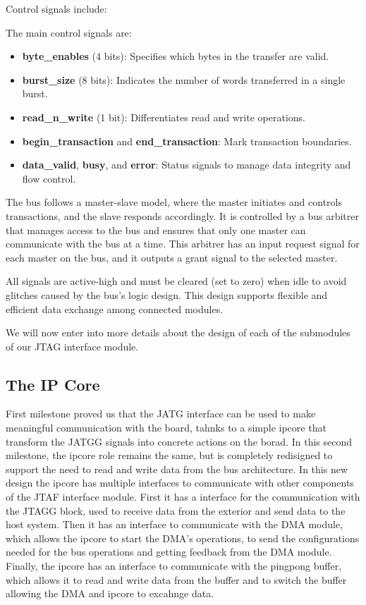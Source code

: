 \documentclass[a4paper,11pt,oneside]{report}
\begin{document}
Control signals include:

The main control signals are:

\begin{itemize}
    \item \textbf{byte\_enables} (4 bits): Specifies which bytes in the transfer are valid.
    \item \textbf{burst\_size} (8 bits): Indicates the number of words transferred in a single burst.
    \item \textbf{read\_n\_write} (1 bit): Differentiates read and write operations.
    \item \textbf{begin\_transaction} and \textbf{end\_transaction}: Mark transaction boundaries.
    \item \textbf{data\_valid}, \textbf{busy}, and \textbf{error}: Status signals to manage data integrity and flow control.
\end{itemize}

The bus follows a master-slave model, where the master initiates and controls transactions, and the slave responds accordingly. It is
controlled by a bus arbitrer that manages access to the bus and ensures that only one master can communicate with the bus at a time.
This arbitrer has an input request signal for each master on the bus, and it outputs a grant signal to the selected master.

All signals are active-high and must be cleared (set to zero) when idle to avoid glitches caused by the bus’s logic design. 
This design supports flexible and efficient data exchange among connected modules.

We will now enter into more details about the design of each of the submodules of our JTAG interface module.

\subsection{The IP Core}

First milestone proved us that the JATG interface can be used to make meaningful communication with the board, tahnks to a simple ipcore that
transform the JATGG signals into concrete actions on the borad. In this second milestone, the ipcore role remains the same, 
but is completely redisigned to support the need to read and write data from the bus architecture. In this new design the ipcore has multiple interfaces to 
communicate with other components of the JTAF interface module.
First it has a interface for the communication with the JTAGG block, used to receive data from the exterior and send data to the host system.
Then it has an interface to communicate with the DMA module, which allows the ipcore to start the DMA's operations, to send the configurations needed for the bus operations and 
getting feedback from the DMA module.
Finally, the ipcore has an interface to communicate with the pingpong buffer, which allows it to read and write data from the buffer and to switch the buffer allowing the DMA and ipcore to 
excahnge data.
\end{document}
